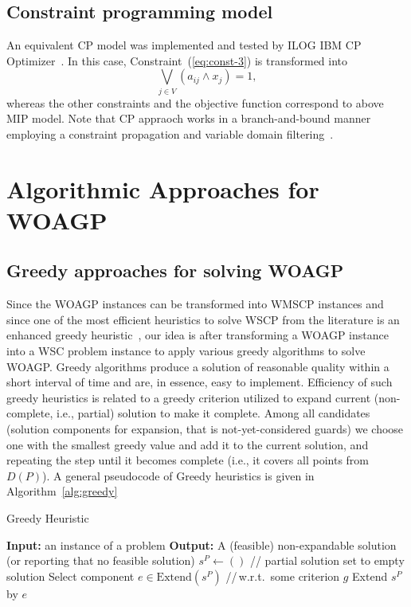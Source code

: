 \documentclass[runningheads,a4paper]{elsarticle}
\begin{document}
	\subsection{Constraint programming model} An equivalent CP model was implemented and tested by ILOG IBM CP Optimizer~\cite{}. In this case,  Constraint~(\ref{eq:const-3}) is transformed into
	\begin{equation}
	\bigvee_{ j \in V } (a_{ij} \wedge x_j) = 1,
	\end{equation}
	whereas the other constraints and the objective function correspond to above MIP model. Note that CP appraoch works in a branch-and-bound manner employing a constraint propagation and variable domain filtering~\cite{laborie2018ibm}.
	\section{Algorithmic Approaches for WOAGP}
	\subsection{Greedy approaches for solving WOAGP}
	Since the WOAGP instances can be transformed into  WMSCP instances and since one of the most efficient heuristics to solve WSCP from the literature is an enhanced greedy heuristic~\cite{chvatal1979greedy}, our idea is after transforming a WOAGP instance into a WSC problem instance to	apply various greedy algorithms to solve WOAGP. Greedy algorithms produce a solution of reasonable quality within a short interval of time and are, in essence, easy to implement. Efficiency of such greedy heuristics is related to a greedy criterion utilized to expand current (non-complete, i.e., partial) solution to make it complete. Among all candidates (solution components for expansion, that is not-yet-considered guards) we choose one with the smallest greedy value and add it to the current solution, and repeating the step until it becomes complete (i.e., it covers all  points from $D(P)$).
	A general pseudocode of Greedy heuristics is given in Algorithm~\ref{alg:greedy}
	
	\begin{algorithm}[!t]
		\caption{Greedy Heuristic}\label{alg:greedy}
		\begin{algorithmic}[1]
			\State \textbf{Input:} an instance of a problem
			\State \textbf{Output:} A (feasible) non-expandable solution (or reporting that no feasible solution)
			\State $s^{P} \gets ()$ \hspace{0.3cm}// partial solution set to empty solution
			\State Select component $e \in  \text{Extend}(s^{P})$ \hspace{0.3cm}//\,w.r.t.\  some criterion $g$
			\State Extend $s^{P}$ by $e$
			\EndWhile
		\end{algorithmic}
	\end{algorithm}
\end{document}
